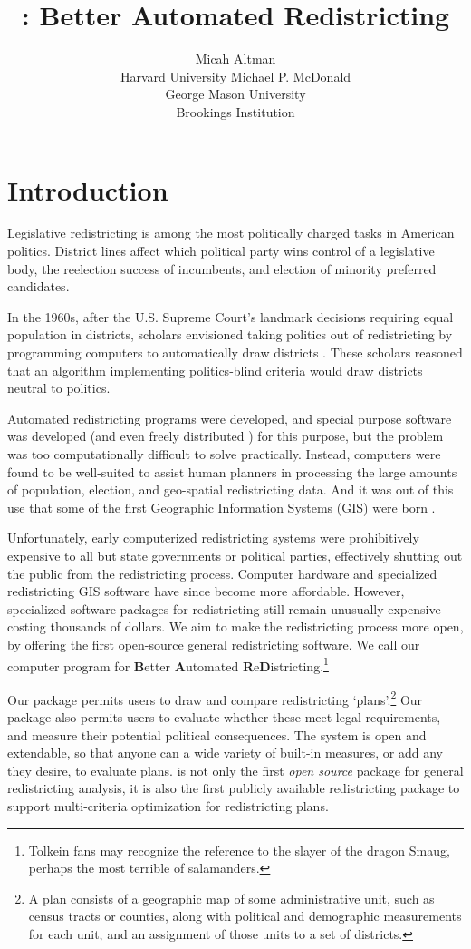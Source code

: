 \documentclass[article]{JSSstyle/jss}
\author{Micah Altman\\Harvard University
\And Michael P. McDonald \\George Mason University\\Brookings Institution
}
\title{\pkg{BARD}: Better Automated Redistricting}
\begin{document}
\section{Introduction}

Legislative redistricting is among the most politically charged 
tasks in American politics.  District lines affect which political 
party wins control of a legislative body, the reelection success of 
incumbents, and election of minority preferred candidates. 

In the 1960s, after the U.S. Supreme Court's landmark decisions requiring equal population in districts, scholars envisioned taking politics out of redistricting by 
programming computers to automatically draw districts \citep[][]{Vickrey61,WeaverHess63,Nagel1965}. These scholars reasoned that an algorithm implementing 
politics-blind criteria would draw districts neutral to politics. 

Automated redistricting programs were developed, and special purpose software was developed (and even freely distributed \citep[see]{Nagel1965}) for this purpose,  but the problem was too computationally difficult to solve practically.  Instead, computers were found to be well-suited to assist human planners in processing the large amounts of population, election, and geo-spatial  redistricting data.  And it was out of this use that some of the first Geographic Information Systems (GIS) 
were born \citep{AltMacMcD05}.  

Unfortunately, early computerized redistricting systems were prohibitively expensive to all but state governments or political parties, effectively shutting out the public from the redistricting process. Computer hardware and specialized redistricting GIS software have since become more affordable. However, specialized software packages for redistricting still remain unusually expensive -- costing thousands of dollars. We aim to make the redistricting process more open, by  offering the first open-source general redistricting software. We call our computer program  for \textbf{B}etter \textbf{A}utomated 
\textbf{R}e\textbf{D}istricting.\footnote{Tolkein fans may recognize the 
reference to the slayer of the dragon Smaug, perhaps the most 
terrible of salamanders.}

Our package permits users to draw and compare redistricting `plans'.\footnote{A plan consists of a geographic map of some administrative unit, such as census tracts or counties, along with political and demographic measurements for each unit, and an assignment of those units to a set of districts.} Our package also permits users to evaluate whether these meet legal requirements, and measure their potential political consequences. The system is open and extendable, so that anyone can a wide variety of built-in measures, or add any they desire, to evaluate plans.    is not only the first  \emph{open source} package for general redistricting analysis, it is also the first publicly available redistricting package to support multi-criteria optimization for redistricting plans.
\end{document}
